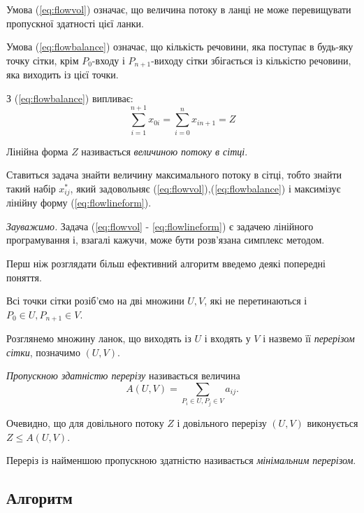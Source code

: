 \documentclass[12pt,a4paper]{book}
\begin{document}
Умова (\ref{eq:flowvol}) означає, що величина потоку в ланці не може перевищувати пропускної здатності цієї ланки.

Умова (\ref{eq:flowbalance}) означає, що кількість речовини, яка поступає в будь-яку точку сітки, крім $P_0$-входу і $P_{n+1}$-виходу сітки збігається із кількістю речовини, яка виходить із цієї точки.

З (\ref{eq:flowbalance}) випливає:
\begin{equation} \sum_{i=1}^{n+1} x_{0 i} = \sum_{i=0}^{n} x_{i n+1} = Z \label{eq:flowlineform} \end{equation}

Лінійна форма $Z$ називається \emph{величиною потоку в сітці}.

Ставиться задача знайти величину максимального потоку в сітці, тобто знайти такий набір $x_{ij}^*$, який задовольняє (\ref{eq:flowvol}),(\ref{eq:flowbalance}) і максимізує лінійну форму (\ref{eq:flowlineform}).

{\it Зауважимо.} Задача (\ref{eq:flowvol} - \ref{eq:flowlineform}) є задачею лінійного програмування і, взагалі кажучи, може бути розв’язана симплекс методом.

Перш ніж розглядати більш ефективний алгоритм введемо деякі попередні поняття.

Всі точки сітки розіб’ємо на дві множини $U, V$, які не перетинаються і $P_0 \in U, P_{n+1} \in V$.

Розглянемо множину ланок, що виходять із $U$ і входять у $V$ і назвемо її \emph{перерізом сітки}, позначимо $(U, V)$.

\emph{Пропускною здатністю перерізу} називається величина
\begin{equation} A(U, V) = \sum_{P_i \in U, P_j \in V} a_{ij}. \end{equation}

Очевидно, що для довільного потоку $Z$ і довільного перерізу $(U, V)$ виконується $Z \le A(U, V)$.

Переріз із найменшою пропускною здатністю називається \emph{мінімальним перерізом}.

\subsection{Алгоритм}
\end{document}
